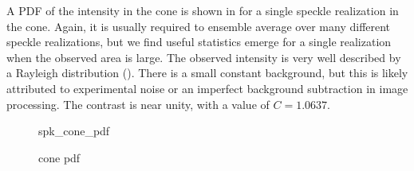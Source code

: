 A PDF of the intensity in the cone is shown in  for a
single speckle realization in the cone.  Again, it is usually required to
ensemble average over many different speckle realizations, but we find
useful statistics emerge for a single realization when the observed area is
large.  The observed intensity is very well described by a Rayleigh
distribution ().  There is a small constant
background, but this is likely attributed to experimental noise or an
imperfect background subtraction in image processing.  The contrast is near
unity, with a value of $C=1.0637$. 
\begin{figure}[ht]
\centering
{spk_cone_pdf}
\caption{cone pdf}
\label{fig:conepdf}
\end{figure}

